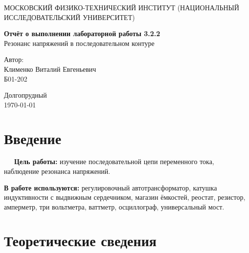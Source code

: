 \documentclass[a4paper,12pt]{article} %
\date{\today}
\begin{document}
\begin{titlepage}
	\begin{center}
		{\large МОСКОВСКИЙ ФИЗИКО-ТЕХНИЧЕСКИЙ ИНСТИТУТ (НАЦИОНАЛЬНЫЙ ИССЛЕДОВАТЕЛЬСКИЙ УНИВЕРСИТЕТ)}
	\end{center}
	
	\vspace{4.5cm}
	{\huge
		\begin{center}
			{\bf Отчёт о выполнении лабораторной работы 3.2.2}\\
			Резонанс напряжений в последовательном контуре
		\end{center}
	}
	\vspace{2cm}
	\begin{flushright}
		{\LARGE Автор:\\ Клименко Виталий Евгеньевич \\
			\vspace{0.2cm}
			Б01-202}
	\end{flushright}
	\vspace{8cm}
	\begin{center}
		Долгопрудный\\
		\today
	\end{center}
\end{titlepage}


\section{Введение}

 \ \ \ \textbf{Цель работы:} изучение последовательной цепи переменного тока, наблюдение резонанса напряжений.

\textbf{В работе используются:} регулировочный автотрансформатор, катушка индуктивности с выдвижным сердечником, магазин ёмкостей, реостат, резистор, амперметр, три вольтметра, ваттметр, осциллограф, универсальный мост.

\section{Теоретические сведения}
\end{document}
